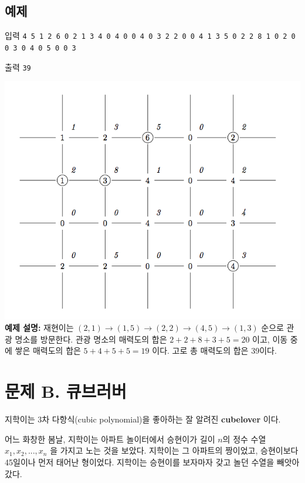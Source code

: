 \documentclass{article}
\begin{document}
\subsection{예제}
입력
\bgroup\obeylines
\texttt{4 5
1 2 6 0 2
1 3 4 0 4
0 0 4 0 3
2 2 0 0 4
1 3 5 0 2
2 8 1 0 2
0 0 3 0 4
0 5 0 0 3 \newline \newline}
\egroup

출력
\bgroup\obeylines
\texttt{39 \newline}
\egroup

\includegraphics{fig1.png}\newline
\textbf{예제 설명:} 재현이는 $(2, 1) \rightarrow (1, 5) \rightarrow (2, 2) \rightarrow (4, 5) \rightarrow (1, 3)$ 순으로 관광 명소를 방문한다. 관광 명소의 매력도의 합은 $2 + 2 + 8 + 3 + 5 = 20$ 이고, 이동 중에 쌓은 매력도의 합은 $5 + 4 + 5 + 5 = 19$ 이다. 고로 총 매력도의 합은 39이다. 


\newpage


\section{문제 B. 큐브러버}
지학이는 3차 다항식(cubic polynomial)을 좋아하는 잘 알려진 \textbf{cubelover} 이다. \newline

어느 화창한 봄날, 지학이는 아파트 놀이터에서 승현이가 길이 $n$의 정수 수열 $x_1, x_2, ..., x_n$ 을 가지고 노는 것을 보았다. 지학이는 그 아파트의 짱이었고, 승현이보다 45일이나 먼저 태어난 형이었다. 지학이는 승현이를 보자마자  갖고 놀던 수열을 빼앗아 갔다. \newline
\end{document}
